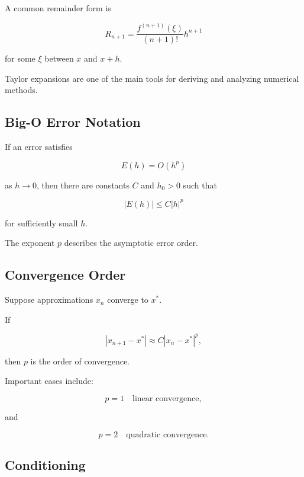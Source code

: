 A common remainder form is

\[
\boxed{
R_{n+1}
=
\frac{
f^{(n+1)}(\xi)
}{
(n+1)!
}
h^{n+1}
}
\]

for some \(\xi\) between \(x\) and \(x+h\).

Taylor expansions are one of the main tools for deriving and analyzing
numerical methods.

\subsection{Big-O Error Notation}
\label{subsec:big-o-numerical-error}

If an error satisfies

\[
E(h)
=
O(h^p)
\]

as \(h\to0\), then there are constants \(C\) and \(h_0>0\) such that

\[
\boxed{
|E(h)|
\leq
C|h|^p
}
\]

for sufficiently small \(h\).

The exponent \(p\) describes the asymptotic error order.

\subsection{Convergence Order}
\label{subsec:convergence-order}

Suppose approximations \(x_n\) converge to \(x^*\).

If

\[
\boxed{
|x_{n+1}-x^*|
\approx
C
|x_n-x^*|^p,
}
\]

then \(p\) is the order of convergence.

Important cases include:

\[
\boxed{
p=1
\quad
\text{linear convergence},
}
\]

and

\[
\boxed{
p=2
\quad
\text{quadratic convergence}.
}
\]

\subsection{Conditioning}
\label{subsec:numerical-conditioning}

